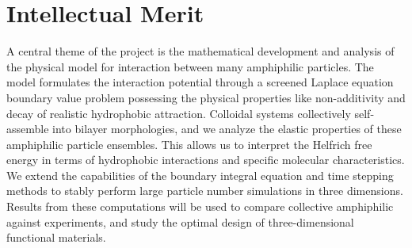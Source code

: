 \section{Intellectual Merit}
A central theme of the project is the mathematical development and
analysis of the physical model for interaction between many amphiphilic
particles. The model formulates the interaction potential through a
screened Laplace equation boundary value problem possessing the physical
properties like non-additivity and decay of realistic hydrophobic
attraction. Colloidal systems collectively self-assemble into bilayer
morphologies, and we analyze the elastic properties of these amphiphilic
particle ensembles. This allows us to interpret the Helfrich free energy
in terms of hydrophobic interactions and specific molecular
characteristics. We extend the capabilities of the boundary integral
equation and time stepping methods to stably perform large particle
number simulations in three dimensions. Results from these computations
will be used to compare collective amphiphilic against experiments, and
study the optimal design of three-dimensional functional materials. 



